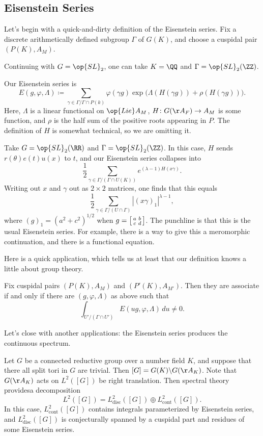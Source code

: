 \documentclass{article}
\begin{document}
\subsection{Eisenstein Series}
Let's begin with a quick-and-dirty definition of the Eisenstein series. Fix a discrete arithmetically defined subgroup $\Gamma$ of $G(K)$, and choose a cuspidal pair $(P(K),A_M)$.
\begin{example}
	Continuing with $G=\op{SL}_2$, one can take $K=\QQ$ and $\Gamma=\op{SL}_2(\ZZ)$.
\end{example}
Our Eisenstein series is
\[E(g,\varphi,\Lambda)\coloneqq\sum_{\gamma\in\Gamma/\Gamma\cap P(k)}\varphi(\gamma g)\exp\big(\Lambda(H(\gamma g))+\rho(H(\gamma g))\big).\]
Here, $\Lambda$ is a linear functional on $\op{Lie}A_M$, $H\colon G(\AA_F)\to A_M$ is some function, and $\rho$ is the half sum of the positive roots appearing in $P$. The definition of $H$ is somewhat technical, so we are omitting it.
\begin{example}
	Take $G=\op{SL}_2(\RR)$ and $\Gamma=\op{SL}_2(\ZZ)$. In this case, $H$ sends $r(\theta)e(t)u(x)$ to $t$, and our Eisenstein series collapses into
	\[\frac12\sum_{\gamma\in\Gamma/(\Gamma\cap U(K))}e^{(\lambda-1)H(x\gamma)}.\]
	Writing out $x$ and $\gamma$ out as $2\times2$ matrices, one finds that this equals
	\[\frac12\sum_{\gamma\in\Gamma/(U\cap\Gamma)}\left|(x\gamma)_1\right|^{\lambda-1},\]
	where $(g)_1=\left(a^2+c^2\right)^{1/2}$ when $g=\begin{bsmallmatrix}
		a & b \\ c & d
	\end{bsmallmatrix}$. The punchline is that this is the usual Eisenstein series. For example, there is a way to give this a meromorphic continuation, and there is a functional equation.
\end{example}
Here is a quick application, which tells us at least that our definition knows a little about group theory.
\begin{proposition}
	Fix cuspidal pairs $(P(K),A_M)$ and $(P'(K),A_{M'})$. Then they are associate if and only if there are $(g,\varphi,\Lambda)$ as above such that
	\[\int_{U'/(\Gamma\cap U')}E(ug,\varphi,\Lambda)\,du\ne0.\]
\end{proposition}
Let's close with another applications: the Eisenstein series produces the continuous spectrum.
\begin{theorem}
	Let $G$ be a connected reductive group over a number field $K$, and suppose that there all split tori in $G$ are trivial. Then $[G]=G(K)\backslash G(\AA_K)$. Note that $G(\AA_K)$ acts on $L^2([G])$ be right translation. Then spectral theory providesa decomposition
	\[L^2([G])=L^2_{\mathrm{disc}}([G])\oplus L^2_{\mathrm{cont}}([G]).\]
	In this case, $L^2_{\mathrm{cont}}([G])$ contains integrals parameterized by Eisenstein series, and $L^2_{\mathrm{disc}}([G])$ is conjecturally spanned by a cuspidal part and residues of some Eisenstein series.
\end{theorem}
\end{document}
